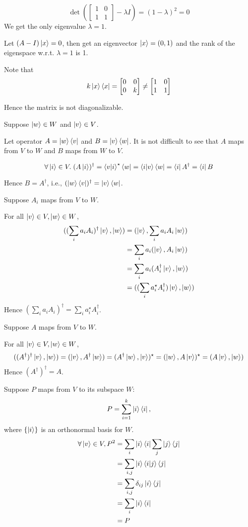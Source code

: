 \documentclass{homeworg}
\begin{document}
\exercise*
\[\det (\begin{bmatrix} 1 & 0 \\ 1 & 1 \end{bmatrix}-\lambda I)=(1-\lambda)^2=0\]
We get the only eigenvalue $\lambda=1$.

Let $(A-I)\ket{x}=0$, then get an eigenvector $\ket{x}=(0,1)$ and the rank of the eigenspace w.r.t. $\lambda=1$ is 1.

Note that
\[k\ket{x}\bra{x}=\begin{bmatrix} 0 & 0 \\ 0 & k \end{bmatrix}\neq\begin{bmatrix} 1 & 0 \\ 1 & 1 \end{bmatrix}\]

Hence the matrix is not diagonalizable.

\exercise*
Suppose $\ket{w}\in W$ and $\ket{v}\in V$.

Let operator $A=\ket{w}\bra{v}$ and $B=\ket{v}\bra{w}$. It is not difficult to see that $A$ maps from $V$ to $W$ and $B$ maps from $W$ to $V$.

\[\forall \ket{i}\in V.\;(A\ket{i})^\dagger=\braket{v|i}^\star\bra{w}=\braket{i|v}\bra{w}=\bra{i}A^\dagger=\bra{i}B\]

Hence $B=A^\dagger$, i.e., $(\ket{w}\bra{v})^\dagger=\ket{v}\bra{w}$.

\exercise*
Suppose $A_i$ maps from $V$ to $W$.

For all $\ket{v}\in V, \ket{w}\in W$,
\begin{align}
((\sum_i a_i A_i)^\dagger\ket{v},\ket{w})&=(\ket{v},\sum_i a_i A_i\ket{w})\nonumber\\
&=\sum_i a_i(\ket{v},A_i\ket{w})\nonumber\\
&=\sum_i a_i(A_i^\dagger\ket{v},\ket{w})\nonumber\\
&=((\sum_i a_i^\star A_i^\dagger)\ket{v},\ket{w})\nonumber
\end{align}
Hence $(\sum_i a_i A_i)^\dagger=\sum_i a_i^\star A_i^\dagger$.

\exercise*
Suppose $A$ maps from $V$ to $W$.

For all $\ket{v}\in V, \ket{w}\in W$,
\[
((A^\dagger)^\dagger\ket{v},\ket{w})=(\ket{v},A^\dagger\ket{w})=(A^\dagger\ket{w},\ket{v})^\star=(\ket{w},A\ket{v})^\star=(A\ket{v},\ket{w})
\]
Hence $(A^\dagger)^\dagger=A$.

\exercise*
Suppose $P$ maps from $V$ to its subspace $W$: \[P=\sum_{i=1}^k\ket{i}\bra{i},\]
where $\{\ket{i}\}$ is an orthonormal basis for $W$.
\begin{align}
    \forall \ket{v}\in V, P^2&=\sum_{i}\ket{i}\bra{i}\sum_{j}\ket{j}\bra{j}\nonumber\\
    &=\sum_{i,j}\ket{i}\braket{i|j}\bra{j}\nonumber\\
    &=\sum_{i,j}\delta_{ij}\ket{i}\bra{j}\nonumber\\
    &=\sum_{i}\ket{i}\bra{i}\nonumber\\
    &=P\nonumber
\end{align}
\end{document}

